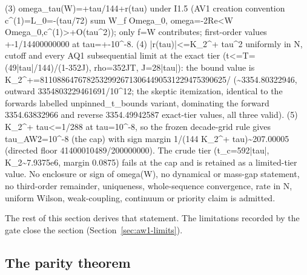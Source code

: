 \begin{gatequote}
(3) omega\_tau(W)=+tau/144+r(tau) under I1.5 (AV1 creation convention
c\textasciicircum{}(1)=L\_0=-(tau/72) sum W\_f Omega\_0, omega=-2Re<W
Omega\_0,c\textasciicircum{}(1)>+O(tau\textasciicircum{}2)); only f=W
contributes; first-order values +-1/14400000000 at
tau=+-10\textasciicircum{}-8. (4) |r(tau)|<=K\_2\textasciicircum{}+
tau\textasciicircum{}2 uniformly in N, cutoff and every AQ1 subsequential
limit at the exact tier (t<=T=(49|tau|/144)/(1-352J), rho=352JT, J=28|tau|):
the bound value is
K\_2\textasciicircum{}+=81108864767825329926713064490531229475390625/
(\textasciitilde{}3354.80322946, outward
3354803229461691/10\textasciicircum{}12; the skeptic itemization, identical to
the forward\textquotesingle{}s labelled unpinned\_t\_bounds variant,
dominating the forward 3354.63832966 and reverse 3354.49942587 exact-tier
values, all three valid). (5) K\_2\textasciicircum{}+ tau<=1/288 at
tau=10\textasciicircum{}-8, so the frozen decade-grid rule gives
tau\_AW2=10\textasciicircum{}-8 (the cap) with sign margin 1/(144
K\_2\textasciicircum{}+ tau)\textasciitilde{}207.00005 (directed floor
41400010489/200000000). The crude tier (t\_c=592|tau|,
K\_2\textasciitilde{}7.9375e6, margin 0.0875) fails at the cap and is retained
as a limited-tier value. No enclosure or sign of omega(W), no dynamical or
mass-gap statement, no third-order remainder, uniqueness, whole-sequence
convergence, rate in N, uniform Wilson, weak-coupling, continuum or priority
claim is admitted.
\end{gatequote}
The rest of this section derives that statement. The limitations recorded by
the gate close the section (Section~\ref{sec:aw1-limits}).

\subsection{The parity theorem}
\label{sec:aw1-parity}
